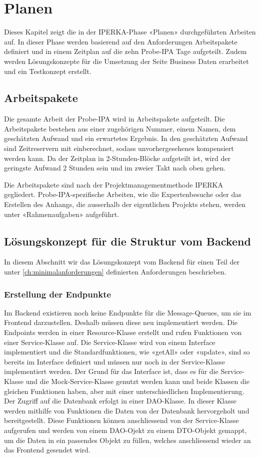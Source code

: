\chapter{Planen}\label{ch:planen}
Dieses Kapitel zeigt die in der IPERKA-Phase «Planen» durchgeführten Arbeiten auf. In dieser Phase werden basierend auf den Anforderungen Arbeitspakete definiert und in einem Zeitplan auf die zehn Probe-IPA Tage aufgeteilt. Zudem werden Lösungskonzepte für die Umsetzung der Seite Business Daten erarbeitet und ein Testkonzept erstellt.

\section{Arbeitspakete}
Die gesamte Arbeit der Probe-IPA wird in Arbeitspakete aufgeteilt. Die Arbeitspakete bestehen aus einer zugehörigen Nummer, einem Namen, dem geschätzten Aufwand und ein erwartetes Ergebnis. In den geschätzten Aufwand sind Zeitreservern mit einberechnet, sodass unvorhergesehenes kompensiert werden kann. Da der Zeitplan in 2-Stunden-Blöcke aufgeteilt ist, wird der geringste Aufwand 2 Stunden sein und im zweier Takt nach oben gehen.

Die Arbeitspakete sind nach der Projektmanagementmethode IPERKA gegliedert. Probe-IPA-spezifische Arbeiten, wie die Expertenbesuche oder das Erstellen des Anhangs, die ausserhalb der eigentlichen Projekts stehen, werden unter «Rahmenaufgaben» aufgeführt.


\section{Lösungskonzept für die Struktur vom Backend}
In diesem Abschnitt wir das Lösungskonzept vom Backend für einen Teil der unter \ref{ch:minimalanforderungen} definierten Anforderungen beschrieben.

\subsection{Erstellung der Endpunkte}
Im Backend existieren noch keine Endpunkte für die Message-Queues, um sie im Frontend darzustellen. Deshalb müssen diese neu implementiert werden. Die Endpoints werden in einer Resource-Klasse erstellt und rufen Funktionen von einer Service-Klasse auf. Die Service-Klasse wird von einem Interface implementiert und die Standardfunktionen, wie «getAll» oder «update», sind so bereits im Interface definiert und müssen nur noch in der Service-Klasse implementiert werden. Der Grund für das Interface ist, dass es für die Service-Klasse und die Mock-Service-Klasse genutzt werden kann und beide Klassen die gleichen Funktionen haben, aber mit einer unterschiedlichen Implementierung.
Der Zugriff auf die Datenbank erfolgt in einer DAO-Klasse. In dieser Klasse werden mithilfe von Funktionen die Daten von der Datenbank hervorgeholt und bereitgestellt. Diese Funktionen können anschliessend von der Service-Klasse aufgerufen und werden von einem DAO-Ojekt zu einem DTO-Objekt gemappt, um die Daten in ein passendes Objekt zu füllen, welches anschliessend wieder an das Frontend gesendet wird.

